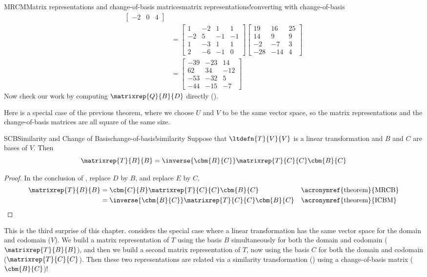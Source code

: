 \begin{example}{MRCM}{Matrix representations and change-of-basis matrices}{matrix representations!converting with change-of-basis}
\begin{align*}
\begin{bmatrix}
-2 & 0 & 4
\end{bmatrix}\\
%
&=
\begin{bmatrix}
 1 & -2 & 1 & 1 \\
 -2 & 5 & -1 & -1 \\
 1 & -3 & 1 & 1 \\
 2 & -6 & -1 & 0
\end{bmatrix}
%
\begin{bmatrix}
 19 & 16 & 25 \\
 14 & 9 & 9 \\
 -2 & -7 & 3 \\
 -28 & -14 & 4
\end{bmatrix}\\
%
&=
\begin{bmatrix}
 -39 & -23 & 14 \\
 62 & 34 & -12 \\
 -53 & -32 & 5 \\
 -44 & -15 & -7
\end{bmatrix}
%
\end{align*}
%
Now check our work by computing $\matrixrep{Q}{B}{D}$ directly ().
%
\end{example}
%
Here is a special case of the previous theorem, where we choose $U$ and $V$ to be the same vector space, so the matrix representations and the change-of-basis matrices are all square of the same size.
%
\begin{theorem}{SCB}{Similarity and Change of Basis}{change-of-basis!similarity}
Suppose that $\ltdefn{T}{V}{V}$ is a linear transformation and $B$ and $C$ are bases of $V$.  Then%
\begin{equation*}
\matrixrep{T}{B}{B}=\inverse{\cbm{B}{C}}\matrixrep{T}{C}{C}\cbm{B}{C}
\end{equation*}
%
\end{theorem}
%
\begin{proof}
In the conclusion of , replace $D$ by $B$, and replace $E$ by $C$,
%
\begin{align*}
\matrixrep{T}{B}{B}
&=\cbm{C}{B}\matrixrep{T}{C}{C}\cbm{B}{C}&&\text{\acronymref{theorem}{MRCB}}\\
&=\inverse{\cbm{B}{C}}\matrixrep{T}{C}{C}\cbm{B}{C}&&\text{\acronymref{theorem}{ICBM}}
\end{align*}
%
\end{proof}
%
This is the third surprise of this chapter.   considers the special case where a linear transformation has the same vector space for the domain and codomain ($V$).  We build a matrix representation of $T$ using the basis $B$ simultaneously for both the domain and codomain ($\matrixrep{T}{B}{B}$), and then we build a second matrix representation of $T$, now using the basis $C$ for both the domain and codomain ($\matrixrep{T}{C}{C}$).  Then these two representations are related via a similarity transformation () using a change-of-basis matrix ($\cbm{B}{C}$)!\par
